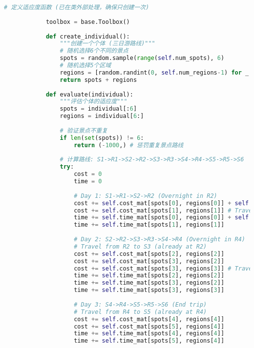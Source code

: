 \begin{lstlisting}[language=Python]
            # 定义适应度函数 (已在类外部处理，确保只创建一次)
            
            toolbox = base.Toolbox()
            
            def create_individual():
                """创建一个个体 (三日游路线)"""
                # 随机选择6个不同的景点
                spots = random.sample(range(self.num_spots), 6)
                # 随机选择5个区域
                regions = [random.randint(0, self.num_regions-1) for _ in range(5)]
                return spots + regions
            
            def evaluate(individual):
                """评估个体的适应度"""
                spots = individual[:6]
                regions = individual[6:]
                
                # 验证景点不重复
                if len(set(spots)) != 6:
                    return (-1000,) # 惩罚重复景点路线
                
                # 计算路线: S1->R1->S2->R2->S3->R3->S4->R4->S5->R5->S6
                try:
                    cost = 0
                    time = 0
                    
                    # Day 1: S1->R1->S2->R2 (Overnight in R2)
                    cost += self.cost_mat[spots[0], regions[0]] + self.cost_mat[spots[1], regions[0]]
                    cost += self.cost_mat[spots[1], regions[1]] # Travel from S2 to R2 for overnight
                    time += self.time_mat[spots[0], regions[0]] + self.time_mat[spots[1], regions[0]]
                    time += self.time_mat[spots[1], regions[1]]
                    
                    # Day 2: S2->R2->S3->R3->S4->R4 (Overnight in R4)
                    # Travel from R2 to S3 (already at R2)
                    cost += self.cost_mat[spots[2], regions[2]]
                    cost += self.cost_mat[spots[3], regions[2]]
                    cost += self.cost_mat[spots[3], regions[3]] # Travel from S4 to R4 for overnight
                    time += self.time_mat[spots[2], regions[2]]
                    time += self.time_mat[spots[3], regions[2]]
                    time += self.time_mat[spots[3], regions[3]]
                    
                    # Day 3: S4->R4->S5->R5->S6 (End trip)
                    # Travel from R4 to S5 (already at R4)
                    cost += self.cost_mat[spots[4], regions[4]]
                    cost += self.cost_mat[spots[5], regions[4]]
                    time += self.time_mat[spots[4], regions[4]]
                    time += self.time_mat[spots[5], regions[4]]
    

\end{lstlisting}
